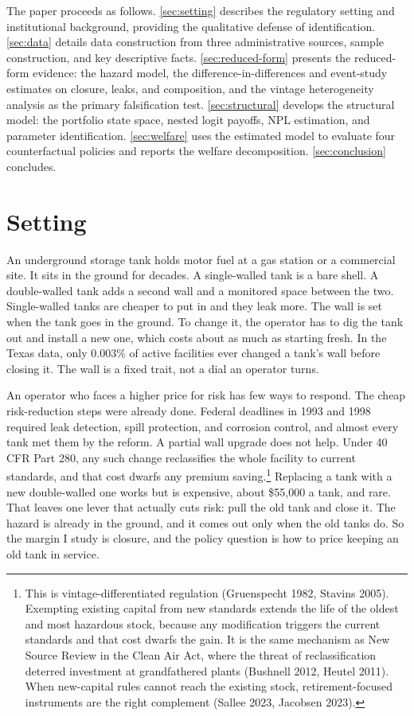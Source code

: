 \documentclass[
  12pt,
]{article}
\begin{document}
The paper proceeds as follows. \autoref{sec:setting} describes the
regulatory setting and institutional background, providing the
qualitative defense of identification. \autoref{sec:data} details data
construction from three administrative sources, sample construction, and
key descriptive facts. \autoref{sec:reduced-form} presents the
reduced-form evidence: the hazard model, the difference-in-differences
and event-study estimates on closure, leaks, and composition, and the
vintage heterogeneity analysis as the primary falsification test.
\autoref{sec:structural} develops the structural model: the portfolio
state space, nested logit payoffs, NPL estimation, and parameter
identification. \autoref{sec:welfare} uses the estimated model to
evaluate four counterfactual policies and reports the welfare
decomposition. \autoref{sec:conclusion} concludes.

\section{Setting}\label{setting}

An underground storage tank holds motor fuel at a gas station or a
commercial site. It sits in the ground for decades. A single-walled tank
is a bare shell. A double-walled tank adds a second wall and a monitored
space between the two. Single-walled tanks are cheaper to put in and
they leak more. The wall is set when the tank goes in the ground. To
change it, the operator has to dig the tank out and install a new one,
which costs about as much as starting fresh. In the Texas data, only
0.003\% of active facilities ever changed a tank's wall before closing
it. The wall is a fixed trait, not a dial an operator turns.

An operator who faces a higher price for risk has few ways to respond.
The cheap risk-reduction steps were already done. Federal deadlines in
1993 and 1998 required leak detection, spill protection, and corrosion
control, and almost every tank met them by the reform. A partial wall
upgrade does not help. Under 40 CFR Part 280, any such change
reclassifies the whole facility to current standards, and that cost
dwarfs any premium saving.\footnote{This is vintage-differentiated
  regulation (Gruenspecht 1982, Stavins 2005). Exempting existing
  capital from new standards extends the life of the oldest and most
  hazardous stock, because any modification triggers the current
  standards and that cost dwarfs the gain. It is the same mechanism as
  New Source Review in the Clean Air Act, where the threat of
  reclassification deterred investment at grandfathered plants (Bushnell
  2012, Heutel 2011). When new-capital rules cannot reach the existing
  stock, retirement-focused instruments are the right complement (Sallee
  2023, Jacobsen 2023).} Replacing a tank with a new double-walled one
works but is expensive, about \$55,000 a tank, and rare. That leaves one
lever that actually cuts risk: pull the old tank and close it. The
hazard is already in the ground, and it comes out only when the old
tanks do. So the margin I study is closure, and the policy question is
how to price keeping an old tank in service.
\end{document}
